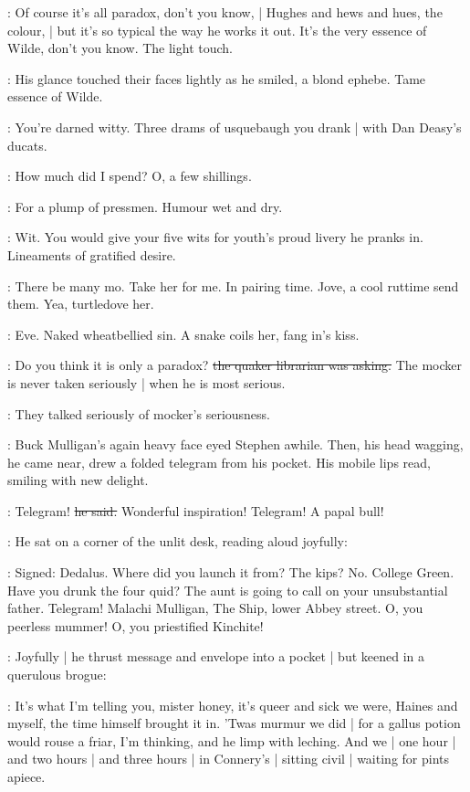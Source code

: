 \best:
Of course it's all paradox,
don't you know, |
Hughes and hews and hues, the colour, |
but it's so typical the way he works it out.
It's the very essence of Wilde,
don't you know.
The light touch.

:
His glance touched their faces lightly as he smiled,
a blond ephebe.
Tame essence of Wilde.

\StephenInt:
You're darned witty.
Three drams of usquebaugh you drank |
with Dan Deasy's ducats.

\StephenInt:
How much did I spend?
O, a few shillings.

\StephenInt:
For a plump of pressmen.
Humour wet and dry.

\StephenInt:
Wit.
You would give your five wits for youth's proud livery he pranks in.
Lineaments of gratified desire.

\StephenInt:
There be many mo.
Take her for me.
In pairing time.
Jove, a cool ruttime send them.
Yea, turtledove her.

\StephenInt:
Eve.
Naked wheatbellied sin.
A snake coils her,
fang in's kiss.

\librarian:
Do you think it is only a paradox?
\sout{the quaker librarian was asking.}
The mocker is never taken seriously |
when he is most serious.

:
They talked seriously of mocker's seriousness.

:
Buck Mulligan's again heavy face eyed Stephen awhile.
Then,
his head wagging,
he came near,
drew a folded telegram from his pocket.
His mobile lips read,
smiling with new delight.

\mulligan:
Telegram!
\sout{he said.}
Wonderful inspiration!
Telegram!
A papal bull!

:
He sat on a corner of the unlit desk,
reading aloud joyfully:

\mulligan:
Signed: Dedalus.
Where did you launch it from?
The kips?
No.
College Green.
Have you drunk the four quid?
The aunt is going to call on your unsubstantial father.
Telegram!
Malachi Mulligan, The Ship, lower Abbey street.
O, you peerless mummer!
O, you priestified Kinchite!

:
Joyfully |
he thrust message and envelope into a pocket |
but keened in a querulous brogue:

\mulligan:
It's what I'm telling you,
mister honey,
it's queer and sick we were,
Haines and myself,
the time himself brought it in.
'Twas murmur we did |
for a gallus potion would rouse a friar,
I'm thinking,
and he limp with leching.
And we |
one hour |
and two hours |
and three hours |
in Connery's |
sitting civil |
waiting for pints apiece.

